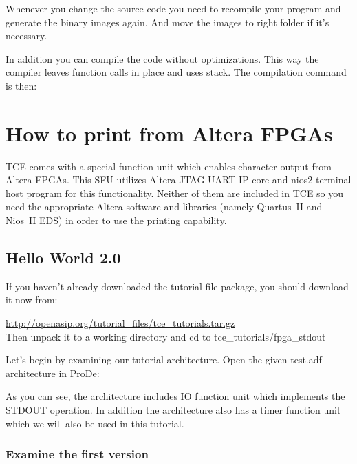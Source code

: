 \documentclass[twoside]{tceusermanual}
\begin{document}
Whenever you change the source code you need to recompile your program and
generate the binary images again. And move the images to right folder if it's
necessary.

In addition you can compile the code without optimizations. This way the
compiler leaves function calls in place and uses stack. The compilation
command is then:





\section{How to print from Altera FPGAs}

TCE comes with a special function unit which enables character output
from Altera FPGAs. This SFU utilizes Altera JTAG UART IP core and
nios2-terminal host program for this functionality. Neither of them
are included in TCE so you need the appropriate Altera software and
libraries (namely Quartus~II and Nios~II EDS) in order to use the
printing capability.

\subsection{Hello World 2.0}

If you haven't already downloaded the tutorial file package, you should
download it now from:

\url{http://openasip.org/tutorial_files/tce_tutorials.tar.gz}\\

Then unpack it to a working directory and cd to tce\_tutorials/fpga\_stdout

Let's begin by examining our tutorial architecture. Open the given test.adf
architecture in ProDe:


As you can see, the architecture includes IO function unit which implements the
STDOUT operation. In addition the architecture also has a timer function unit
which we will also be used in this tutorial.

\subsubsection{Examine the first version}
\end{document}

